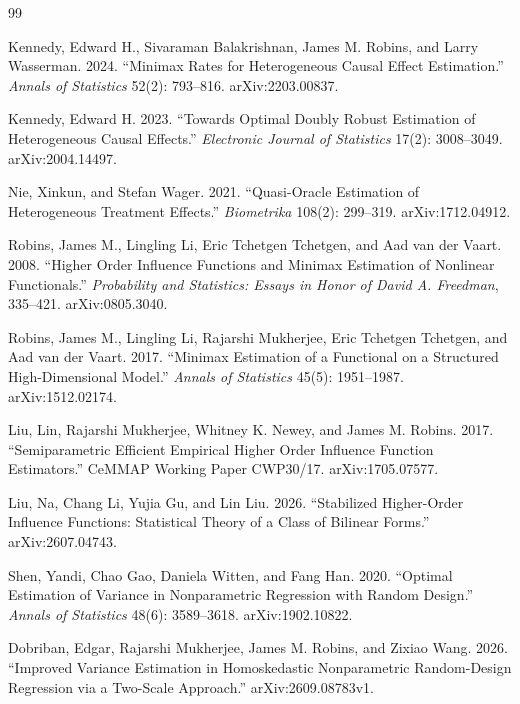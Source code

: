 \documentclass{article}
\begin{document}
\begin{thebibliography}{99}

   Kennedy, Edward H., Sivaraman Balakrishnan, James M. Robins, and Larry Wasserman. 2024. ``Minimax Rates for Heterogeneous Causal Effect Estimation.'' \emph{Annals of Statistics} 52(2): 793--816. arXiv:2203.00837.

   Kennedy, Edward H. 2023. ``Towards Optimal Doubly Robust Estimation of Heterogeneous Causal Effects.'' \emph{Electronic Journal of Statistics} 17(2): 3008--3049. arXiv:2004.14497.

   Nie, Xinkun, and Stefan Wager. 2021. ``Quasi-Oracle Estimation of Heterogeneous Treatment Effects.'' \emph{Biometrika} 108(2): 299--319. arXiv:1712.04912.

   Robins, James M., Lingling Li, Eric Tchetgen Tchetgen, and Aad van der Vaart. 2008. ``Higher Order Influence Functions and Minimax Estimation of Nonlinear Functionals.'' \emph{Probability and Statistics: Essays in Honor of David A. Freedman}, 335--421. arXiv:0805.3040.

   Robins, James M., Lingling Li, Rajarshi Mukherjee, Eric Tchetgen Tchetgen, and Aad van der Vaart. 2017. ``Minimax Estimation of a Functional on a Structured High-Dimensional Model.'' \emph{Annals of Statistics} 45(5): 1951--1987. arXiv:1512.02174.

   Liu, Lin, Rajarshi Mukherjee, Whitney K. Newey, and James M. Robins. 2017. ``Semiparametric Efficient Empirical Higher Order Influence Function Estimators.'' CeMMAP Working Paper CWP30/17. arXiv:1705.07577.

   Liu, Na, Chang Li, Yujia Gu, and Lin Liu. 2026. ``Stabilized Higher-Order Influence Functions: Statistical Theory of a Class of Bilinear Forms.'' arXiv:2607.04743.

   Shen, Yandi, Chao Gao, Daniela Witten, and Fang Han. 2020. ``Optimal Estimation of Variance in Nonparametric Regression with Random Design.'' \emph{Annals of Statistics} 48(6): 3589--3618. arXiv:1902.10822.

   Dobriban, Edgar, Rajarshi Mukherjee, James M. Robins, and Zixiao Wang. 2026. ``Improved Variance Estimation in Homoskedastic Nonparametric Random-Design Regression via a Two-Scale Approach.'' arXiv:2609.08783v1.


\end{thebibliography}
\end{document}
